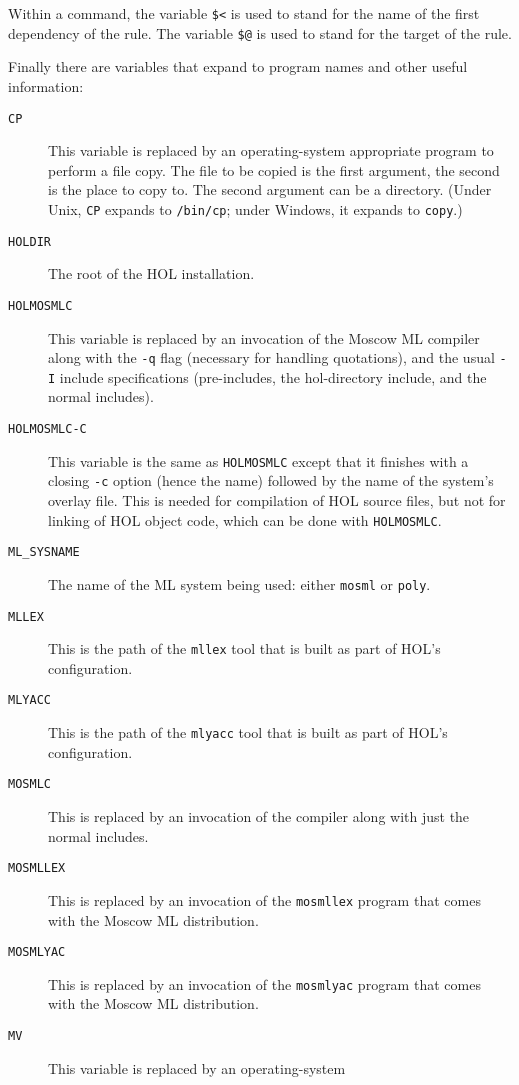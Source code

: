 Within a command, the variable \texttt{\$<} is used to stand for the
name of the first dependency of the rule.  The variable \texttt{\$@} is
used to stand for the target of the rule.

Finally there are variables that expand to program names and other
useful information:
\begin{description}
\item[\texttt{CP}] This variable is replaced by an operating-system
  appropriate program to perform a file copy.  The file to be copied
  is the first argument, the second is the place to copy to.  The
  second argument can be a directory.  (Under Unix, \texttt{CP}
  expands to \texttt{/bin/cp}; under Windows, it expands to
  \texttt{copy}.)
\item[\texttt{HOLDIR}] The root of the HOL installation.
\item[\texttt{HOLMOSMLC}] This variable is replaced by an invocation
  of the Moscow ML compiler along with the \texttt{-q} flag (necessary
  for handling quotations), and the usual \texttt{-I} include
  specifications (pre-includes, the hol-directory include, and the
  normal includes).
\item[\texttt{HOLMOSMLC-C}] This variable is the same as
  \texttt{HOLMOSMLC} except that it finishes with a closing
  \texttt{-c} option (hence the name) followed by the name of the
  system's overlay file.  This is needed for compilation of HOL source
  files, but not for linking of HOL object code, which can be done
  with \texttt{HOLMOSMLC}.
\item[\texttt{ML\_SYSNAME}] The name of the ML system being used:
  either \texttt{mosml} or \texttt{poly}.
\item[\texttt{MLLEX}] This is the path of the \texttt{mllex} tool that
  is built as part of HOL's configuration.
\item[\texttt{MLYACC}] This is the path of the \texttt{mlyacc} tool that
  is built as part of HOL's configuration.
\item[\texttt{MOSMLC}] This is replaced by an invocation of the
  compiler along with just the normal includes.
\item[\texttt{MOSMLLEX}] This is replaced by an invocation of the
  \texttt{mosmllex} program that comes with the Moscow ML
  distribution.
\item[\texttt{MOSMLYAC}] This is replaced by an invocation of the
  \texttt{mosmlyac} program that comes with the Moscow ML
  distribution.
\item[\texttt{MV}] This variable is replaced by an operating-system

\end{description}
